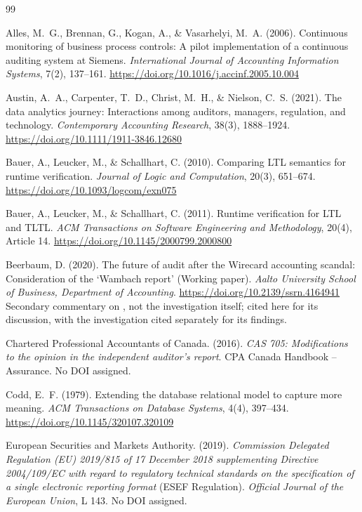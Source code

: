 \documentclass[11pt,a4paper]{article}
\theoremstyle{definition}
\theoremstyle{remark}
\begin{document}
\begin{thebibliography}{99}

Alles, M.~G., Brennan, G., Kogan, A., \& Vasarhelyi, M.~A. (2006).
Continuous monitoring of business process controls: A pilot implementation of a continuous auditing system at Siemens.
\emph{International Journal of Accounting Information Systems}, 7(2), 137--161. \url{https://doi.org/10.1016/j.accinf.2005.10.004}

Austin, A.~A., Carpenter, T.~D., Christ, M.~H., \& Nielson, C.~S. (2021).
The data analytics journey: Interactions among auditors, managers, regulation, and technology.
\emph{Contemporary Accounting Research}, 38(3), 1888--1924. \url{https://doi.org/10.1111/1911-3846.12680}

Bauer, A., Leucker, M., \& Schallhart, C. (2010).
Comparing LTL semantics for runtime verification.
\emph{Journal of Logic and Computation}, 20(3), 651--674. \url{https://doi.org/10.1093/logcom/exn075}

Bauer, A., Leucker, M., \& Schallhart, C. (2011).
Runtime verification for LTL and TLTL.
\emph{ACM Transactions on Software Engineering and Methodology}, 20(4), Article 14. \url{https://doi.org/10.1145/2000799.2000800}

Beerbaum, D. (2020).
The future of audit after the Wirecard accounting scandal: Consideration of the `Wambach report' (Working paper).
\emph{Aalto University School of Business, Department of Accounting}. \url{https://doi.org/10.2139/ssrn.4164941}
Secondary commentary on \citet{wambach2021}, not the investigation itself; cited here for its discussion, with the investigation cited separately for its findings.

Chartered Professional Accountants of Canada. (2016).
\emph{CAS 705: Modifications to the opinion in the independent auditor's report}. CPA Canada Handbook -- Assurance. No DOI assigned.

Codd, E.~F. (1979).
Extending the database relational model to capture more meaning.
\emph{ACM Transactions on Database Systems}, 4(4), 397--434. \url{https://doi.org/10.1145/320107.320109}

European Securities and Markets Authority. (2019).
\emph{Commission Delegated Regulation (EU) 2019/815 of 17 December 2018 supplementing Directive 2004/109/EC with regard to regulatory technical standards on the specification of a single electronic reporting format} (ESEF Regulation). \emph{Official Journal of the European Union}, L 143. No DOI assigned.


\end{thebibliography}
\end{document}
